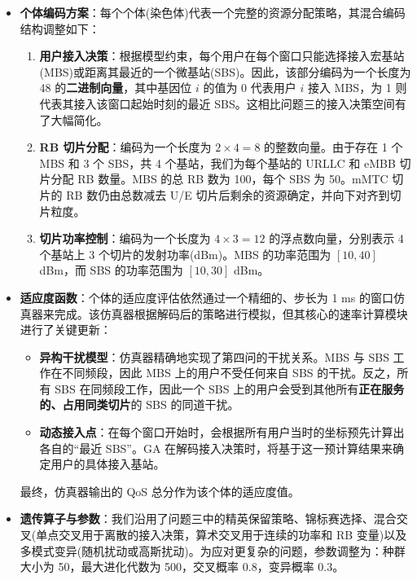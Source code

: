 \begin{itemize}
    \item \textbf{个体编码方案}：每个个体(染色体)代表一个完整的资源分配策略，其混合编码结构调整如下：
    \begin{enumerate}
        \item \textbf{用户接入决策}：根据模型约束，每个用户在每个窗口只能选择接入宏基站(MBS)或距离其最近的一个微基站(SBS)。因此，该部分编码为一个长度为 48 的\textbf{二进制向量}，其中基因位 $i$ 的值为 0 代表用户 $i$ 接入 MBS，为 1 则代表其接入该窗口起始时刻的最近 SBS。这相比问题三的接入决策空间有了大幅简化。
        \item \textbf{RB 切片分配}：编码为一个长度为 $2 \times 4 = 8$ 的整数向量。由于存在 1 个 MBS 和 3 个 SBS，共 4 个基站，我们为每个基站的 URLLC 和 eMBB 切片分配 RB 数量。MBS 的总 RB 数为 100，每个 SBS 为 50。mMTC 切片的 RB 数仍由总数减去 U/E 切片后剩余的资源确定，并向下对齐到切片粒度。
        \item \textbf{切片功率控制}：编码为一个长度为 $4 \times 3 = 12$ 的浮点数向量，分别表示 4 个基站上 3 个切片的发射功率(dBm)。MBS 的功率范围为 $[10, 40]$ dBm，而 SBS 的功率范围为 $[10, 30]$ dBm。
    \end{enumerate}

    \item \textbf{适应度函数}：个体的适应度评估依然通过一个精细的、步长为 1 ms 的窗口仿真器来完成。该仿真器根据解码后的策略进行模拟，但其核心的速率计算模块进行了关键更新：
    \begin{itemize}
        \item \textbf{异构干扰模型}：仿真器精确地实现了第四问的干扰关系。MBS 与 SBS 工作在不同频段，因此 MBS 上的用户不受任何来自 SBS 的干扰。反之，所有 SBS 在同频段工作，因此一个 SBS 上的用户会受到其他所有\textbf{正在服务的、占用同类切片}的 SBS 的同道干扰。
        \item \textbf{动态接入点}：在每个窗口开始时，会根据所有用户当时的坐标预先计算出各自的“最近 SBS”。GA 在解码接入决策时，将基于这一预计算结果来确定用户的具体接入基站。
    \end{itemize}
    最终，仿真器输出的 QoS 总分作为该个体的适应度值。

    \item \textbf{遗传算子与参数}：我们沿用了问题三中的精英保留策略、锦标赛选择、混合交叉(单点交叉用于离散的接入决策，算术交叉用于连续的功率和 RB 变量)以及多模式变异(随机扰动或高斯扰动)。为应对更复杂的问题，参数调整为：种群大小为 50，最大进化代数为 500，交叉概率 0.8，变异概率 0.3。
\end{itemize}

